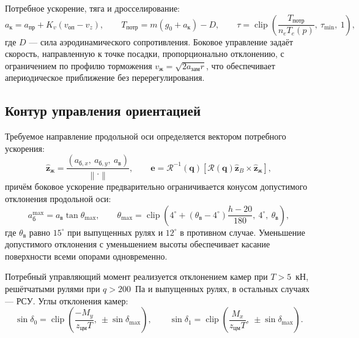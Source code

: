 \documentclass[11pt,a4paper]{article}
\newcommand{\vect}[1]{\bm{#1}}
\newcommand{\quat}[1]{\bm{#1}}
\newcommand{\Rot}{\mathcal{R}}
\begin{document}
Потребное ускорение, тяга и дросселирование:
\begin{equation}
a_{\text{к}} = a_{\text{пр}} + K_v\left(v_{\text{оп}}-v_z\right),
\qquad
T_{\text{потр}} = m\left(g_0+a_{\text{к}}\right) - D,
\qquad
\tau = \operatorname{clip}\!\left(\frac{T_{\text{потр}}}{n_e T_e(p)},\
 \tau_{\min},\ 1\right),
\end{equation}
где $D$ — сила аэродинамического сопротивления. Боковое управление задаёт
скорость, направленную к точке посадки, пропорционально отклонению, с
ограничением по профилю торможения
$v_{\text{ж}}=\sqrt{2a_{\text{зам}}r}$, что обеспечивает апериодическое
приближение без перерегулирования.

\subsection{Контур управления ориентацией}

Требуемое направление продольной оси определяется вектором потребного ускорения:
\begin{equation}
\hat{\vect{z}}_{\text{ж}} = \frac{\left(a_{\text{б},x},\ a_{\text{б},y},\
 a_{\text{в}}\right)}{\left\lVert\cdot\right\rVert},
\qquad
\vect{e} = \Rot^{-1}(\quat{q})
 \left[\Rot(\quat{q})\hat{\vect{z}}_B\times\hat{\vect{z}}_{\text{ж}}\right],
\end{equation}
причём боковое ускорение предварительно ограничивается конусом допустимого
отклонения продольной оси:
\begin{equation}
a_{\text{б}}^{\max}=a_{\text{в}}\tan\theta_{\max},
\qquad
\theta_{\max}=\operatorname{clip}\!\left(4^\circ
 +\left(\theta_{\text{в}}-4^\circ\right)\frac{h-20}{180},\
 4^\circ,\ \theta_{\text{в}}\right),
\end{equation}
где $\theta_{\text{в}}$ равно $15^\circ$ при выпущенных рулях и $12^\circ$ в
противном случае. Уменьшение допустимого отклонения с уменьшением высоты
обеспечивает касание поверхности всеми опорами одновременно.

Потребный управляющий момент реализуется отклонением камер при $T>5$~кН,
решётчатыми рулями при $q>200$~Па и выпущенных рулях, в остальных случаях — РСУ.
Углы отклонения камер:
\begin{equation}
\sin\delta_0 = \operatorname{clip}\!\left(
 \frac{-M_{y}}{z_{\text{цм}}T},\ \pm\sin\delta_{\max}\right),
\qquad
\sin\delta_1 = \operatorname{clip}\!\left(
 \frac{M_{x}}{z_{\text{цм}}T},\ \pm\sin\delta_{\max}\right).
\end{equation}
\end{document}
